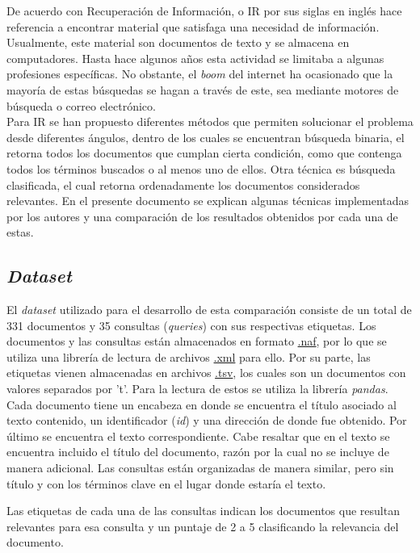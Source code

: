 De acuerdo con \cite{IR-book} Recuperación de Información, o IR por sus siglas en inglés hace referencia a encontrar material que satisfaga una necesidad de información. Usualmente, este material son documentos de texto y se almacena en computadores. Hasta hace algunos años esta actividad se limitaba a algunas profesiones específicas. No obstante, el \textit{boom} del internet ha ocasionado que la mayoría de estas búsquedas se hagan a través de este, sea mediante motores de búsqueda o correo electrónico.\\

Para IR se han propuesto diferentes métodos que permiten solucionar el problema desde diferentes ángulos, dentro de los cuales se encuentran búsqueda binaria, el retorna todos los documentos que cumplan cierta condición, como que contenga todos los términos buscados o al menos uno de ellos. Otra técnica es búsqueda clasificada, el cual retorna ordenadamente los documentos considerados relevantes. En el presente documento se explican algunas técnicas implementadas por los autores y una comparación de los resultados obtenidos por cada una de estas.\\

\subsection*{\textit{Dataset}}

El \textit{dataset} utilizado para el desarrollo de esta comparación consiste de un total de 331 documentos y 35 consultas (\textit{queries}) con sus respectivas etiquetas. Los documentos y las consultas están almacenados en formato \url{.naf}, por lo que se utiliza una librería de lectura de archivos \url{.xml} para ello. Por su parte, las etiquetas vienen almacenadas en archivos \url{.tsv}, los cuales son un documentos con valores separados por 't'. Para la lectura de estos se utiliza la librería \textit{pandas}.\\

Cada documento tiene un encabeza en donde se encuentra el título asociado al texto contenido, un identificador (\textit{id}) y una dirección de donde fue obtenido. Por último se encuentra el texto correspondiente. Cabe resaltar que en el texto se encuentra incluido el título del documento, razón por la cual no se incluye de manera adicional. Las consultas están organizadas de manera similar, pero sin título y con los términos clave en el lugar donde estaría el texto.

Las etiquetas de cada una de las consultas indican los documentos que resultan relevantes para esa consulta y un puntaje de 2 a 5 clasificando la relevancia del documento.

